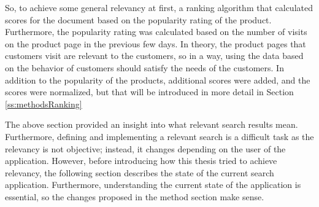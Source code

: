 So, to achieve some general relevancy at first, a ranking algorithm that calculated
scores for the document based on the popularity rating of the product.
Furthermore, the popularity rating was calculated based on the number of visits on
the product page in the previous few days.
In theory, the product pages that customers visit are relevant to the customers, so in a way,
using the data based on the behavior of customers should satisfy the needs of the customers.
In addition to the popularity of the products, additional scores were added, and the scores were normalized,
but that will be introduced in more detail in Section \ref{ss:methodsRanking}


The above section provided an insight into what relevant search results mean.
Furthermore, defining and implementing a relevant search is a difficult task as
the relevancy is not objective; instead, it changes depending on the user of the application.
However, before introducing how this thesis tried to achieve relevancy, the following section 
describes the state of the current search application.
Furthermore, understanding the current state of the application is essential, so the 
changes proposed in the method section make sense.


